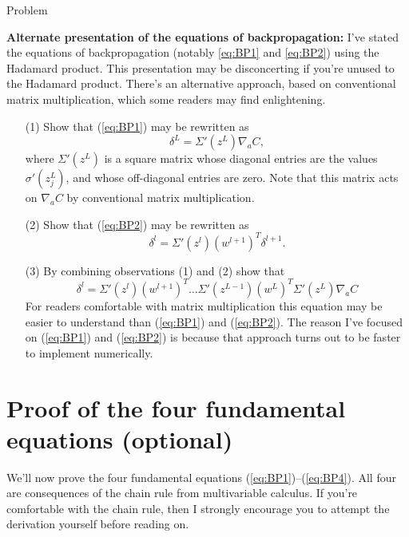 \documentclass[a4paper,twoside,10pt]{book}
\begin{document}
\begin{exercize}{Problem}
	\item \textbf{Alternate presentation of the equations of backpropagation:} I've stated the equations of backpropagation (notably \ref{eq:BP1} and \ref{eq:BP2}) using the Hadamard product. This presentation may be disconcerting if you're unused to the Hadamard product. There's an alternative approach, based on conventional matrix multiplication, which some readers may find enlightening.
	\begin{enumerate}
		\item[(1)]  Show that (\ref{eq:BP1}) may be rewritten as
		\begin{equation}
			\delta^L = \Sigma'(z^L) \nabla_a C,
			\tag{33}\label{eq:33}
		\end{equation}
		where $\Sigma'(z^L)$ is a square matrix whose diagonal entries are the values $\sigma'(z^L_j)$, and whose off-diagonal entries are zero. Note that this matrix acts on $\nabla_a C$ by conventional matrix multiplication.
		\item[(2)] Show that (\ref{eq:BP2}) may be rewritten as
		\begin{equation}
			\delta^l = \Sigma'(z^l) (w^{l+1})^T \delta^{l+1}.
			\tag{34}\label{eq:34}
		\end{equation}
		\item[(3)] By combining observations (1) and (2) show that
		\begin{equation}
			\delta^l = \Sigma'(z^l) (w^{l+1})^T \ldots \Sigma'(z^{L-1}) (w^L)^T \Sigma'(z^L) \nabla_a C
			\tag{35}\label{eq:35}
		\end{equation}
		For readers comfortable with matrix multiplication this equation may be easier to understand than (\ref{eq:BP1}) and (\ref{eq:BP2}). The reason I've focused on (\ref{eq:BP1}) and (\ref{eq:BP2}) is because that approach turns out to be faster to implement numerically.
	\end{enumerate}
\end{exercize}
\section{Proof of the four fundamental equations (optional)}
\label{sec:2.5}
We'll now prove the four fundamental equations (\ref{eq:BP1})--(\ref{eq:BP4}). All four are consequences of the chain rule from multivariable calculus. If you're comfortable with the chain rule, then I strongly encourage you to attempt the derivation yourself before reading on.
\end{document}
